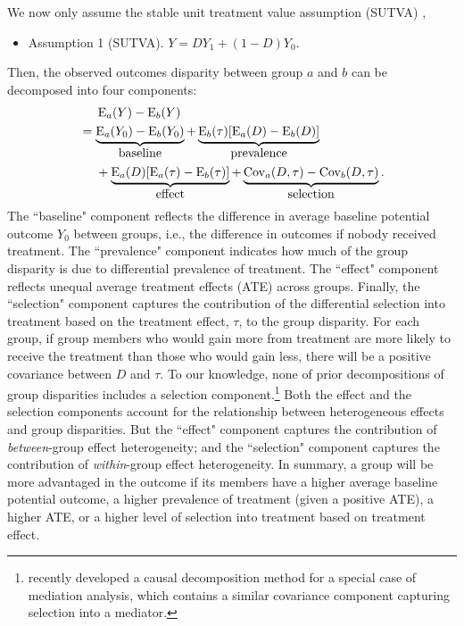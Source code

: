 \documentclass[12pt,a4paper]{article}
\newcommand{\Cov}{\operatorname{Cov}}
\newcommand{\E}{\operatorname{E}}
\begin{document}
We now only assume the stable unit treatment value assumption (SUTVA) \citep{rubin_randomization_1980}, 
\begin{itemize}
     \item[] Assumption 1 (SUTVA). $Y=D Y_1 + (1-D) Y_0$.
\end{itemize}
Then, the observed outcomes disparity between group $a$ and $b$ can be decomposed into four components: 
\begin{align}
&\phantom{{}={}} \E_a(Y)-\E_b(Y)   \nonumber  \\
&= \underbrace{ \E_a(Y_{0})-\E_b(Y_{0}) }_{\text{\normalsize baseline}}
+ \underbrace{\E_b(\tau) [\E_a(D)-\E_b(D)]}_{\text{\normalsize prevalence}} \nonumber  \\ 
&\phantom{{}={}} + \underbrace{\E_a(D)[ \E_a(\tau) - \E_b(\tau) ]}_{\text{\normalsize effect}} 
+ \underbrace{\Cov_a(D, \tau) -  \Cov_b(D, \tau)}_{\text{\normalsize  selection}}. \label{eqt1}
\end{align}
The ``baseline" component reflects the difference in average baseline potential outcome $Y_0$ between groups, i.e., the difference in outcomes if nobody received treatment. The ``prevalence" component indicates how much of the group disparity is due to differential prevalence of treatment. The ``effect" component reflects unequal average treatment effects (ATE) across groups. Finally, the ``selection" component captures the contribution of the differential selection into treatment based on the treatment effect, $\tau$,  to the group disparity. 
For each group, if group members who would gain more from treatment are more likely to receive the treatment than those who would gain less, there will be a positive covariance between $D$ and $\tau$. To our knowledge, none of prior decompositions of group disparities includes a selection component.\footnote{\citet{zhou_attendance_2022} recently developed a causal decomposition method for a special case of mediation analysis, which contains a similar covariance component capturing selection into a mediator.} 
Both the effect and the selection components account for the relationship between heterogeneous effects and group disparities. But the ``effect" component captures the contribution of \emph{between}-group effect heterogeneity; and the ``selection" component captures the contribution of \emph{within}-group effect heterogeneity. In summary, a group will be more advantaged in the outcome if its members have a higher average baseline potential outcome, a higher prevalence of treatment (given a positive ATE), a higher ATE, or a higher level of selection into treatment based on treatment effect.
\end{document}
